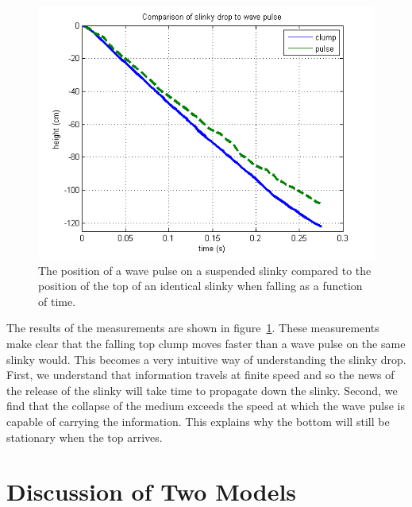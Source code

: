 \documentclass[prb,preprint,superscriptaddress]{revtex4-1}
\newcommand{\fig}[1]{figure~\ref{fig:#1}}
\begin{document}
\begin{figure}[t!]
\begin{center}
\includegraphics[scale=0.5]{figs/ClumpPulse}
\end{center}
\vspace{-4ex}
\caption{The position of a wave pulse on a suspended slinky compared to the position
of the top of an identical slinky when falling as a function of time.}
\label{fig:clumppulse}
\end{figure}

The results of the measurements are shown in \fig{clumppulse}. These measurements
make clear that the falling top clump moves faster than a wave pulse on the same
slinky would. This becomes a very intuitive way of understanding the
slinky drop. First, we understand that information travels at finite speed and so
the news of the release of the slinky will take time to propagate down the slinky.
Second, we find that the collapse of the medium exceeds the speed at which
the wave pulse is capable of carrying the information. This explains why the
bottom will still be stationary when the top arrives.

\section{Discussion of Two Models}
\label{sec:discussion}

\end{document}
